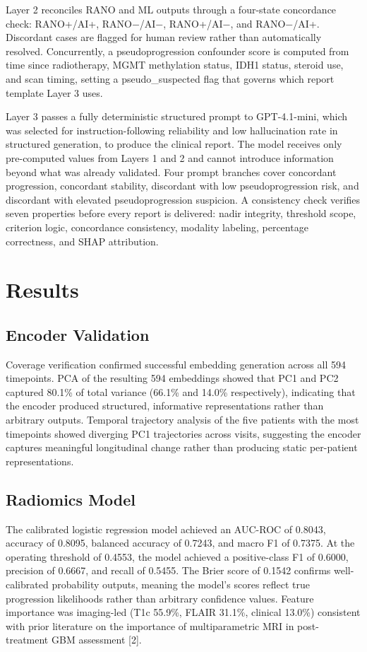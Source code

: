 \documentclass[letterpaper, 10pt, conference]{IEEEtran}
\begin{document}
Layer 2 reconciles RANO and ML outputs through a four-state concordance check: RANO+/AI+, RANO$-$/AI$-$,
RANO+/AI$-$, and RANO$-$/AI+. Discordant cases are flagged for human review rather than automatically resolved.
Concurrently, a pseudoprogression confounder score is computed from time since radiotherapy, MGMT methylation
status, IDH1 status, steroid use, and scan timing, setting a pseudo\_suspected flag that governs which report
template Layer 3 uses.

Layer 3 passes a fully deterministic structured prompt to GPT-4.1-mini, which was selected for
instruction-following reliability and low hallucination rate in structured generation, to produce the clinical
report. The model receives only pre-computed values from Layers 1 and 2 and cannot introduce information beyond what
was already validated. Four prompt branches cover concordant progression, concordant stability, discordant with low
pseudoprogression risk, and discordant with elevated pseudoprogression suspicion. A consistency check verifies seven
properties before every report is delivered: nadir integrity, threshold scope, criterion logic, concordance
consistency, modality labeling, percentage correctness, and SHAP attribution.

\section{Results}

\subsection{Encoder Validation}
Coverage verification confirmed successful embedding generation across all 594 timepoints. PCA of the resulting 594
embeddings showed that PC1 and PC2 captured 80.1\% of total variance (66.1\% and 14.0\% respectively), indicating
that the encoder produced structured, informative representations rather than arbitrary outputs. Temporal trajectory
analysis of the five patients with the most timepoints showed diverging PC1 trajectories across visits, suggesting
the encoder captures meaningful longitudinal change rather than producing static per-patient representations.

\subsection{Radiomics Model}
The calibrated logistic regression model achieved an AUC-ROC of 0.8043, accuracy of 0.8095, balanced accuracy of
0.7243, and macro F1 of 0.7375. At the operating threshold of 0.4553, the model achieved a positive-class F1 of
0.6000, precision of 0.6667, and recall of 0.5455. The Brier score of 0.1542 confirms well-calibrated probability
outputs, meaning the model's scores reflect true progression likelihoods rather than arbitrary confidence values.
Feature importance was imaging-led (T1c 55.9\%, FLAIR 31.1\%, clinical 13.0\%) consistent with prior literature on
the importance of multiparametric MRI in post-treatment GBM assessment [2].
\end{document}

